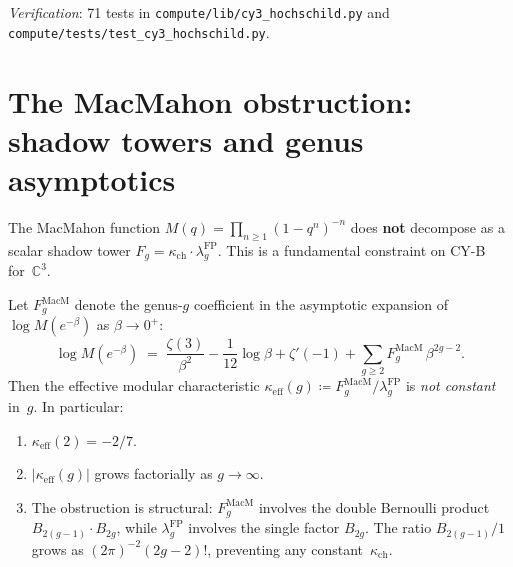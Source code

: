 \documentclass[11pt]{article}
\newcommand{\C}{\mathbb{C}}
\begin{document}
\noindent\textit{Verification}: 71 tests in
\texttt{compute/lib/cy3\_hochschild.py}
and \texttt{compute/tests/test\_cy3\_hochschild.py}.

\section{The MacMahon obstruction: shadow towers and genus asymptotics}
\label{sec:macmahon-obstruction}

\begin{warning}
\label{warn:macmahon-negative}
The MacMahon function $M(q) = \prod_{n \geq 1}(1-q^n)^{-n}$
does \textbf{not} decompose as a scalar shadow tower
$F_g = \kappa_{\mathrm{ch}} \cdot \lambda_g^{\mathrm{FP}}$.
This is a fundamental constraint on CY-B for~$\C^3$.
\end{warning}

\begin{theorem}
\label{thm:macmahon-non-decomposition}
Let $F_g^{\mathrm{MacM}}$ denote the genus-$g$ coefficient
in the asymptotic expansion of $\log M(e^{-\beta})$ as $\beta \to 0^+$:
\[
 \log M(e^{-\beta}) \;=\;
 \frac{\zeta(3)}{\beta^2}
 - \frac{1}{12}\log\beta
 + \zeta'(-1)
 + \sum_{g \geq 2} F_g^{\mathrm{MacM}}\, \beta^{2g-2}.
\]
Then the effective modular characteristic
$\kappa_{\mathrm{eff}}(g) \coloneqq F_g^{\mathrm{MacM}} / \lambda_g^{\mathrm{FP}}$
is \emph{not constant} in~$g$. In particular:
\begin{enumerate}[label=\textup{(\roman*)}]
 \item $\kappa_{\mathrm{eff}}(2) = -2/7$.
 \item $|\kappa_{\mathrm{eff}}(g)|$ grows factorially as $g \to \infty$.
 \item The obstruction is structural:
 $F_g^{\mathrm{MacM}}$ involves the double Bernoulli product
 $B_{2(g-1)} \cdot B_{2g}$, while
 $\lambda_g^{\mathrm{FP}}$ involves the single factor $B_{2g}$.
 The ratio $B_{2(g-1)}/1$ grows as $(2\pi)^{-2}(2g-2)!$,
 preventing any constant~$\kappa_{\mathrm{ch}}$.
\end{enumerate}
\end{theorem}
\end{document}
